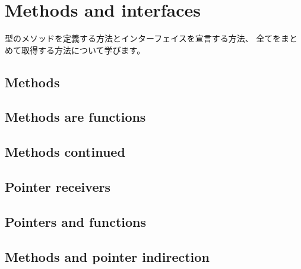\section{Methods and interfaces}

型のメソッドを定義する方法とインターフェイスを宣言する方法、
全てをまとめて取得する方法について学びます。

\subsection{Methods}




\subsection{Methods are functions}




\subsection{Methods continued}




\subsection{Pointer receivers}





\subsection{Pointers and functions}





\subsection{Methods and pointer indirection}





